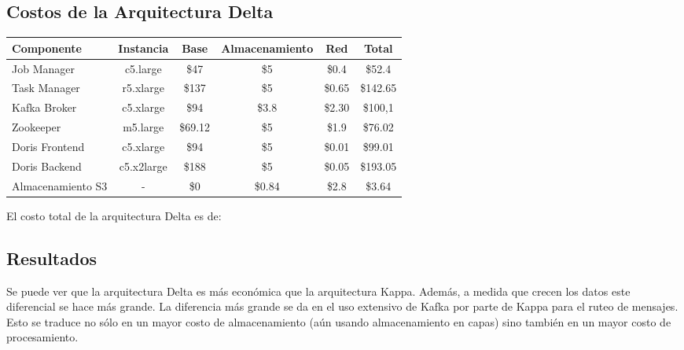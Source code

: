 \subsection{Costos de la Arquitectura Delta}

\begin{longtable}{|p{3cm}|c|c|c|c|c|}
    \hline
    \textbf{Componente} & \textbf{Instancia} & \textbf{Base} & \textbf{Almacenamiento} & \textbf{Red} & \textbf{Total} \\
    \hline
    Job Manager & c5.large & \$47 & \$5 & \$0.4 & \$52.4 \\
    \hline
    Task Manager & r5.xlarge & \$137 & \$5 & \$0.65 & \$142.65 \\
    \hline
    Kafka Broker & c5.xlarge & \$94 & \$3.8 & \$2.30 & \$100,1 \\
    \hline
    Zookeeper & m5.large & \$69.12 & \$5 & \$1.9 & \$76.02 \\
    \hline
    Doris Frontend & c5.xlarge & \$94 & \$5 & \$0.01 & \$99.01 \\
    \hline
    Doris Backend & c5.x2large & \$188 & \$5 & \$0.05 & \$193.05 \\
    \hline
    Almacenamiento S3 & - & \$0 & \$0.84 & \$2.8 & \$3.64 \\
    \hline
\end{longtable}

El costo total de la arquitectura Delta es de:
\newline
\newline
{}
\newpage

\subsection{Resultados}

Se puede ver que la arquitectura Delta es más económica que la arquitectura Kappa.
Además, a medida que crecen los datos este diferencial se hace más grande.
La diferencia más grande se da en el uso extensivo de Kafka por parte de Kappa para el ruteo de mensajes. 
Esto se traduce no sólo en un mayor costo de almacenamiento (aún usando almacenamiento en capas) sino también en un mayor costo de procesamiento.
\newpage